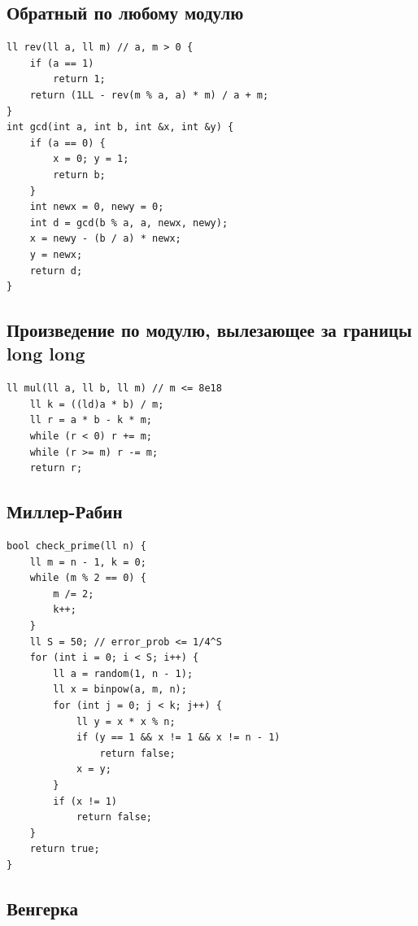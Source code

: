 \documentclass[10pt, portrait,letterpaper]{article}
\begin{document}
\subsection{Обратный по любому модулю}

\begin{verbatim}
ll rev(ll a, ll m) // a, m > 0 {
    if (a == 1)
        return 1;
    return (1LL - rev(m % a, a) * m) / a + m;
}
int gcd(int a, int b, int &x, int &y) {
	if (a == 0) {
		x = 0; y = 1;
		return b;
	}
	int newx = 0, newy = 0;
	int d = gcd(b % a, a, newx, newy);
	x = newy - (b / a) * newx;
	y = newx;
	return d;
}
\end{verbatim}

\subsection{Произведение по модулю, вылезающее за границы long long}
\begin{verbatim}
ll mul(ll a, ll b, ll m) // m <= 8e18
    ll k = ((ld)a * b) / m;
    ll r = a * b - k * m;
    while (r < 0) r += m;
    while (r >= m) r -= m;
    return r;
\end{verbatim}


\subsection{Миллер-Рабин}
\begin{verbatim}
bool check_prime(ll n) {
    ll m = n - 1, k = 0;
    while (m % 2 == 0) {
        m /= 2;
        k++;
    }
    ll S = 50; // error_prob <= 1/4^S
    for (int i = 0; i < S; i++) {
        ll a = random(1, n - 1);
        ll x = binpow(a, m, n);
        for (int j = 0; j < k; j++) {
            ll y = x * x % n;
            if (y == 1 && x != 1 && x != n - 1)
                return false;
            x = y;
        }
        if (x != 1)
            return false;
    }
    return true;
}
\end{verbatim}

\subsection{Венгерка}
\end{document}
